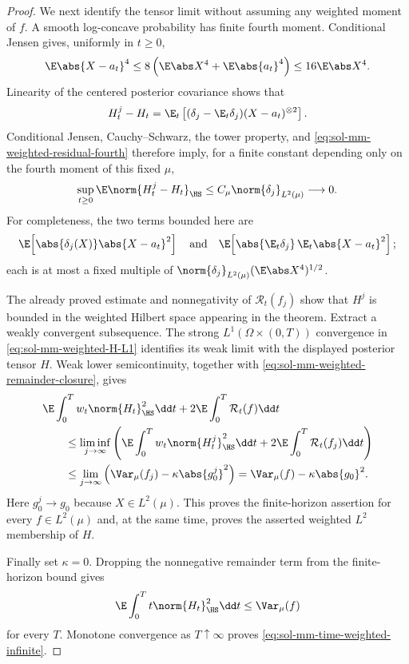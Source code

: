 \documentclass[../main.tex]{subfiles}
\begin{document}
\begin{proof}
We next identify the tensor limit without assuming any weighted moment of $f$.  A smooth
log-concave probability has finite fourth moment.  Conditional Jensen gives, uniformly in
$t\ge0$,
\begin{equation}
  \E\abs{X-a_t}^4
  \le8\left(\E\abs X^4+\E\abs{a_t}^4\right)
  \le16\E\abs X^4.
  \label{eq:sol-mm-weighted-residual-fourth}
\end{equation}
Linearity of the centered posterior covariance shows that
\[
  H_t^j-H_t
  =\E_t\left[(\delta_j-\E_t\delta_j)(X-a_t)^{\otimes2}\right].
\]
Conditional Jensen, Cauchy--Schwarz, the tower property, and
\eqref{eq:sol-mm-weighted-residual-fourth} therefore imply, for a finite constant depending
only on the fourth moment of this fixed $\mu$,
\begin{equation}
  \sup_{t\ge0}\E\norm{H_t^j-H_t}_{\HS}
  \le C_\mu\norm{\delta_j}_{L^2(\mu)}\longrightarrow0.
  \label{eq:sol-mm-weighted-H-L1}
\end{equation}
For completeness, the two terms bounded here are
\[
 \E\!\left[\abs{\delta_j(X)}\abs{X-a_t}^2\right]
 \quad\text{and}\quad
 \E\!\left[\abs{\E_t\delta_j}\,\E_t\abs{X-a_t}^2\right];
\]
each is at most a fixed multiple of
$\norm{\delta_j}_{L^2(\mu)}(\E\abs X^4)^{1/2}$.

The already proved estimate and nonnegativity of $\mathcal R_t(f_j)$ show that $H^j$ is bounded
in the weighted Hilbert space appearing in the theorem.  Extract a weakly convergent
subsequence.  The strong $L^1(\Omega\times(0,T))$ convergence in
\eqref{eq:sol-mm-weighted-H-L1} identifies its weak limit with the displayed posterior tensor
$H$.  Weak lower semicontinuity, together with
\eqref{eq:sol-mm-weighted-remainder-closure}, gives
\begin{align*}
 &\E\int_0^Tw_t\norm{H_t}_{\HS}^2\dd t
   +2\E\int_0^T\mathcal R_t(f)\dd t\\
 &\qquad\le
 \liminf_{j\to\infty}\left(
   \E\int_0^Tw_t\norm{H_t^j}_{\HS}^2\dd t
   +2\E\int_0^T\mathcal R_t(f_j)\dd t\right)\\
 &\qquad\le
 \lim_{j\to\infty}\left(\Var_\mu(f_j)-\kappa\abs{g_0^j}^2\right)
 =\Var_\mu(f)-\kappa\abs{g_0}^2.
\end{align*}
Here $g_0^j\to g_0$ because $X\in L^2(\mu)$.  This proves the finite-horizon assertion for
every $f\in L^2(\mu)$ and, at the same time, proves the asserted weighted $L^2$ membership of
$H$.

Finally set $\kappa=0$.  Dropping the nonnegative remainder term from the finite-horizon bound
gives
\[
  \E\int_0^Tt\norm{H_t}_{\HS}^2\dd t\le\Var_\mu(f)
\]
for every $T$.  Monotone convergence as $T\uparrow\infty$ proves
\eqref{eq:sol-mm-time-weighted-infinite}.
\end{proof}
\end{document}
